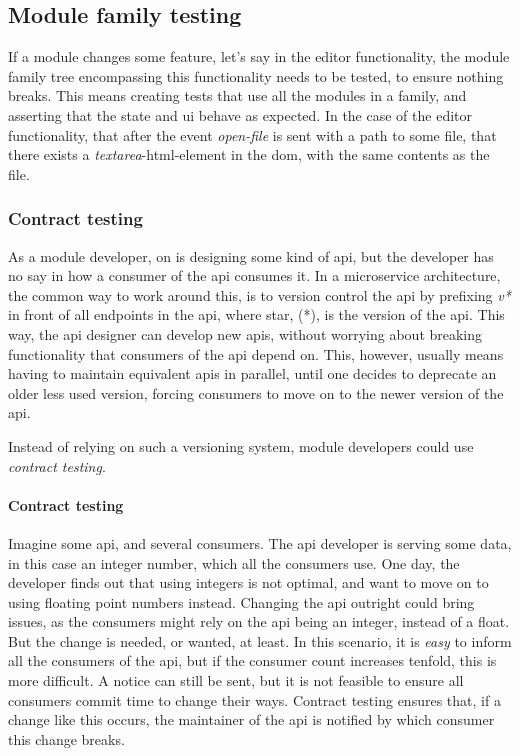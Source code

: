 \subsection{Module family testing}

If a module changes some feature, let's say in the editor functionality, the
module family tree encompassing this functionality needs to be tested, to ensure
nothing breaks. This means creating tests that use all the modules in a family,
and asserting that the state and \gls*{ui} behave as expected. In the case of
the editor functionality, that after the event \textit{open-file} is sent with
a path to some file, that there exists a \textit{textarea}-\gls*{html}-element in
the \gls*{dom}, with the same contents as the file.

\subsubsection{Contract testing}

As a module developer, on is designing some kind of \gls*{api}, but the developer
has no say in how a consumer of the \gls*{api} consumes it. In a microservice
architecture, the common way to work around this, is to version control the
\gls*{api} by prefixing \textit{v*} in front of all endpoints in the \gls*{api},
where star, (*), is the version of the \gls*{api}. This way, the \gls*{api}
designer can develop new \gls*{api}s, without worrying about breaking
functionality that consumers of the \gls*{api} depend on. This, however, usually
means having to maintain equivalent \gls*{api}s in parallel, until one decides
to deprecate an older less used version, forcing consumers to move on to the
newer version of the \gls*{api}.

Instead of relying on such a versioning system, module developers could use
\textit{contract testing}.

\paragraph{Contract testing} Imagine some \gls*{api}, and several consumers.
The \gls*{api} developer is serving some data, in this case an integer number,
which all the consumers use. One day, the developer finds out that using
integers is not optimal, and want to move on to using floating point numbers
instead. Changing the \gls*{api} outright could bring issues, as the consumers
might rely on the \gls*{api} being an integer, instead of a float. But the
change is needed, or wanted, at least. In this scenario, it is \textit{easy} to
inform all the consumers of the \gls*{api}, but if the consumer count increases
tenfold, this is more difficult. A notice can still be sent, but it is not
feasible to ensure all consumers commit time to change their ways. Contract
testing ensures that, if a change like this occurs, the maintainer of the
\gls*{api} is notified by which consumer this change breaks.

